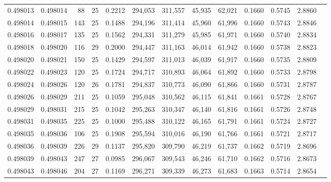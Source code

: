 \begin{tabular}{rrrrrrrrrrrrr}
0.498013 & 0.498014 &  88 &  25 &                                     0.2212 & 294,053 & 311,557 &  45,935 &  62,021 & 0.1660 & 0.5745 & 2.8860 \\
0.498014 & 0.498015 & 143 &  25 &                                     0.1488 & 294,196 & 311,414 &  45,960 &  61,996 & 0.1660 & 0.5743 & 2.8846 \\
0.498016 & 0.498017 & 135 &  25 &                                     0.1562 & 294,331 & 311,279 &  45,985 &  61,971 & 0.1660 & 0.5740 & 2.8834 \\
0.498018 & 0.498020 & 116 &  29 &                                     0.2000 & 294,447 & 311,163 &  46,014 &  61,942 & 0.1660 & 0.5738 & 2.8823 \\
0.498020 & 0.498021 & 150 &  25 &                                     0.1429 & 294,597 & 311,013 &  46,039 &  61,917 & 0.1660 & 0.5735 & 2.8809 \\
0.498022 & 0.498023 & 120 &  25 &                                     0.1724 & 294,717 & 310,893 &  46,064 &  61,892 & 0.1660 & 0.5733 & 2.8798 \\
0.498024 & 0.498026 & 120 &  26 &                                     0.1781 & 294,837 & 310,773 &  46,090 &  61,866 & 0.1660 & 0.5731 & 2.8787 \\
0.498026 & 0.498029 & 211 &  25 &                                     0.1059 & 295,048 & 310,562 &  46,115 &  61,841 & 0.1661 & 0.5728 & 2.8767 \\
0.498029 & 0.498031 & 215 &  25 &                                     0.1042 & 295,263 & 310,347 &  46,140 &  61,816 & 0.1661 & 0.5726 & 2.8748 \\
0.498031 & 0.498035 & 225 &  25 &                                     0.1000 & 295,488 & 310,122 &  46,165 &  61,791 & 0.1661 & 0.5724 & 2.8727 \\
0.498035 & 0.498036 & 106 &  25 &                                     0.1908 & 295,594 & 310,016 &  46,190 &  61,766 & 0.1661 & 0.5721 & 2.8717 \\
0.498036 & 0.498039 & 226 &  29 &                                     0.1137 & 295,820 & 309,790 &  46,219 &  61,737 & 0.1662 & 0.5719 & 2.8696 \\
0.498039 & 0.498043 & 247 &  27 &                                     0.0985 & 296,067 & 309,543 &  46,246 &  61,710 & 0.1662 & 0.5716 & 2.8673 \\
0.498043 & 0.498046 & 204 &  27 &                                     0.1169 & 296,271 & 309,339 &  46,273 &  61,683 & 0.1663 & 0.5714 & 2.8654 \\

\end{tabular}
